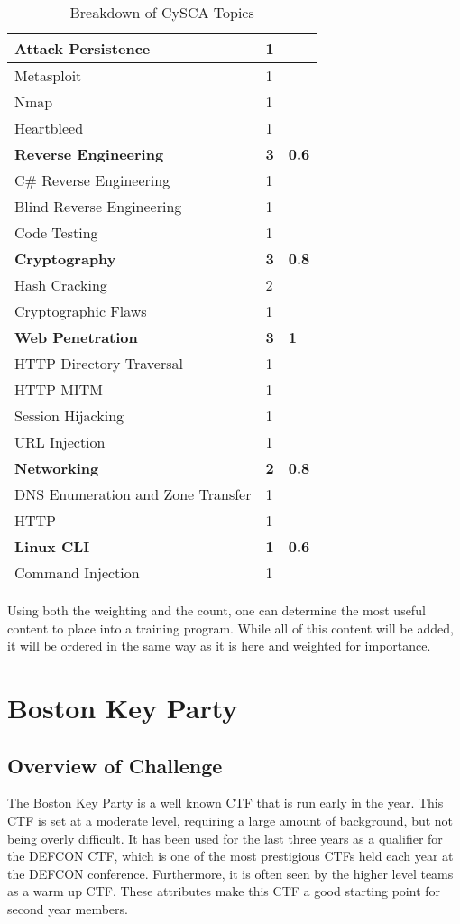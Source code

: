 \documentclass[a4paper,11pt]{report}
\begin{document}
\begin{table}[htb]
\begin{tabular}{| l | l | l |}
				\quad Attack Persistence & 1 & \\ \hline 
				\quad Metasploit & 1 & \\ \hline 
				\quad Nmap & 1 & \\ \hline 
				\quad Heartbleed & 1 & \\ \hline
				\textbf{Reverse Engineering} & \textbf{3} & \textbf{0.6}\\ \hline 
				\quad C\# Reverse Engineering & 1 & \\ \hline
				\quad Blind Reverse Engineering & 1 & \\ \hline 
				\quad Code Testing & 1 & \\ \hline 
				\textbf{Cryptography} & \textbf{3} & \textbf{0.8} \\ \hline 
				\quad Hash Cracking & 2 & \\ \hline
				\quad Cryptographic Flaws & 1 & \\ \hline 
				\textbf{Web Penetration} & \textbf{3} & \textbf{1} \\ \hline
				\quad HTTP Directory Traversal & 1 & \\ \hline
				\quad HTTP MITM & 1 & \\ \hline
				\quad Session Hijacking & 1 & \\ \hline
				\quad URL Injection & 1 & \\ \hline
				\textbf{Networking} & \textbf{2} & \textbf{0.8}\\ \hline
				\quad DNS Enumeration and Zone Transfer & 1 & \\ \hline 
				\quad HTTP & 1 & \\ \hline 
				\textbf{Linux CLI} & \textbf{1} &\textbf{0.6} \\ \hline
				\quad Command Injection & 1 & \\ \hline 
			\end{tabular}
			\caption{Breakdown of CySCA Topics}
			\label{tab:CySEC Breakdown}
		\end{table}
		Using both the weighting and the count, one can determine the most useful content to place into a training program. 
		While all of this content will be added, it will be ordered in the same way as it is here and weighted for importance. 

\chapter{Boston Key Party}
	\section{Overview of Challenge}
		The Boston Key Party is a well known CTF that is run early in the year. 
		This CTF is set at a moderate level, requiring a large amount of background, but not being overly difficult. 
		It has been used for the last three years as a qualifier for the DEFCON CTF, 
		which is one of the most prestigious CTFs held each year at the DEFCON conference. 
		Furthermore, it is often seen by the higher level teams as a warm up CTF. 
		These attributes make this CTF a good starting point for second year members. 
\end{document}
